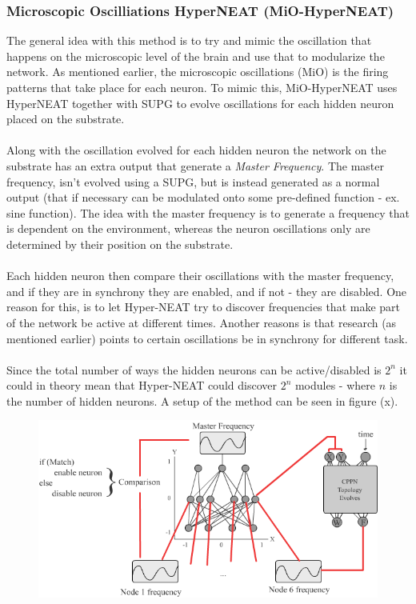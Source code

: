 \documentclass[11pt, a4paper]{article}
\begin{document}
\subsubsection{Microscopic Oscilliations HyperNEAT (MiO-HyperNEAT)}
The general idea with this method is to try and mimic the oscillation that happens on the microscopic level of the brain and use that to modularize the network. As mentioned earlier, the microscopic oscillations (MiO) is the firing patterns that take place for each neuron. To mimic this, MiO-HyperNEAT uses HyperNEAT together with SUPG to evolve oscillations for each hidden neuron placed on the substrate.
\\
\\
Along with the oscillation evolved for each hidden neuron the network on the substrate has an extra output that generate a \textit{Master Frequency}. The master frequency, isn't evolved using a SUPG, but is instead generated as a normal output (that if necessary can be modulated onto some pre-defined function - ex. sine function). The idea with the master frequency is to generate a frequency that is dependent on the environment, whereas the neuron oscillations only are determined by their position on the substrate.
\\
\\
Each hidden neuron then compare their oscillations with the master frequency, and if they are in synchrony they are enabled, and if not - they are disabled. One reason for this, is to let Hyper-NEAT try to discover frequencies that make part of the network be active at different times. Another reasons is that research (as mentioned earlier) points to certain oscillations be in synchrony for different task.
\\
\\
Since the total number of ways the hidden neurons can be active/disabled is $ 2^n $ it could in theory mean that Hyper-NEAT could discover $ 2^n $ modules - where $ n $ is the number of hidden neurons. A setup of the method can be seen in figure (x).
\begin{figure}[!ht]
\centering
\includegraphics[scale=0.5]{MiO-HyperNEAT}
\caption{}
\end{figure}
\end{document}
